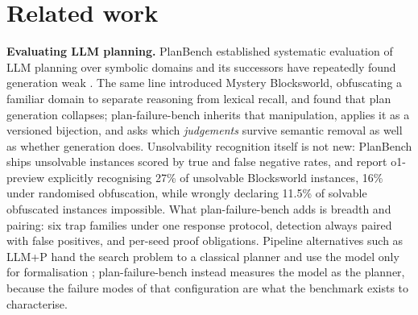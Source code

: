 \documentclass[10pt]{article}
\newcommand{\benchname}{plan-failure-bench}
\begin{document}
\section{Related work}

\textbf{Evaluating LLM planning.} PlanBench established systematic
evaluation of LLM planning over symbolic domains and its successors
have repeatedly found generation weak \citep{valmeekam2023planbench,
valmeekam2023planning}. The same line introduced Mystery Blocksworld,
obfuscating a familiar domain to separate reasoning from lexical
recall, and found that plan generation collapses; \benchname{} inherits
that manipulation, applies it as a versioned bijection, and asks which
\emph{judgements} survive semantic removal as well as whether
generation does. Unsolvability recognition
itself is not new: PlanBench ships unsolvable instances scored by true
and false negative rates, and \citet{valmeekam2024strawberry} report
o1-preview explicitly recognising 27\% of unsolvable Blocksworld
instances, 16\% under randomised obfuscation, while wrongly declaring
11.5\% of solvable obfuscated instances impossible. What \benchname{}
adds is breadth and pairing: six trap families under one response protocol, detection always paired with
false positives, and per-seed proof obligations. Pipeline alternatives such
as LLM+P hand the search problem to a classical planner and use the
model only for formalisation \citep{liu2023llmp}; \benchname{} instead
measures the model as the planner, because the failure modes of that
configuration are what the benchmark exists to characterise.
\end{document}
